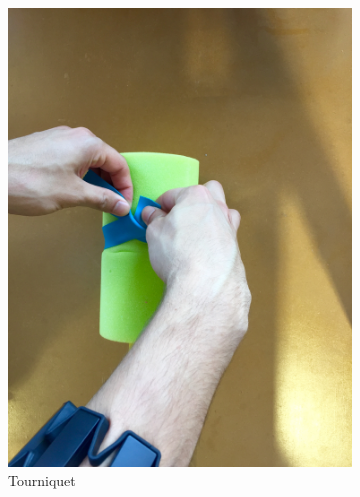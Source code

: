 \begin{figure}
\begin{subfigure}[b]{0.18\textwidth}
 		\includegraphics[width=\textwidth]{pictures/tourniquet}
 		\caption{Tourniquet}
 		\label{fig:tourniquet}
 	\end{subfigure}
	~ %
	\begin{subfigure}[b]{0.18\textwidth}

\end{subfigure}
\end{figure}
